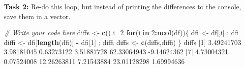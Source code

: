 \documentclass[
]{book}
\newenvironment{Shaded}{\begin{snugshade}}{\end{snugshade}}
\newcommand{\CommentTok}[1]{\textcolor[rgb]{0.56,0.35,0.01}{\textit{#1}}}
\newcommand{\ControlFlowTok}[1]{\textcolor[rgb]{0.13,0.29,0.53}{\textbf{#1}}}
\newcommand{\DecValTok}[1]{\textcolor[rgb]{0.00,0.00,0.81}{#1}}
\newcommand{\FloatTok}[1]{\textcolor[rgb]{0.00,0.00,0.81}{#1}}
\newcommand{\KeywordTok}[1]{\textcolor[rgb]{0.13,0.29,0.53}{\textbf{#1}}}
\newcommand{\NormalTok}[1]{#1}
\newcommand{\OperatorTok}[1]{\textcolor[rgb]{0.81,0.36,0.00}{\textbf{#1}}}
\newcommand{\StringTok}[1]{\textcolor[rgb]{0.31,0.60,0.02}{#1}}
\begin{document}
\begin{Shaded}
\end{Shaded}

\textbf{Task 2:} Re-do this loop, but instead of printing the differences to the console, save them in a vector.

\begin{Shaded}
\begin{Highlighting}[]
\CommentTok{# Write your code here}
\NormalTok{diffs <-}\StringTok{ }\KeywordTok{c}\NormalTok{()}
\NormalTok{i=}\DecValTok{2}
\ControlFlowTok{for}\NormalTok{(i }\ControlFlowTok{in} \DecValTok{2}\OperatorTok{:}\KeywordTok{ncol}\NormalTok{(df))\{}
\NormalTok{  dfi <-}\StringTok{ }\NormalTok{df[,i] ; dfi}
\NormalTok{  diffi <-}\StringTok{ }\NormalTok{dfi[}\KeywordTok{length}\NormalTok{(dfi)] }\OperatorTok{-}\StringTok{ }\NormalTok{dfi[}\DecValTok{1}\NormalTok{] ; diffi}
\NormalTok{  diffs <-}\StringTok{ }\KeywordTok{c}\NormalTok{(diffs,diffi)}
\NormalTok{\}}
\NormalTok{diffs}
\NormalTok{ [}\DecValTok{1}\NormalTok{]  }\FloatTok{3.49241703}  \FloatTok{3.98181045}  \FloatTok{0.63273122}  \FloatTok{3.51887728} \FloatTok{62.33064943} \FloatTok{-9.14624362}
\NormalTok{ [}\DecValTok{7}\NormalTok{]  }\FloatTok{4.73004321}  \FloatTok{0.07524008} \FloatTok{12.26263811}  \FloatTok{7.21543884} \FloatTok{23.01128298}  \FloatTok{1.69994636}
\end{Highlighting}
\end{Shaded}
\end{document}
